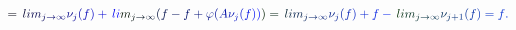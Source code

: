 \documentclass[12pt]{article}
\begin{document}
\makeatletter
\renewcommand*{\@textcolor}[3]{%
  \protect\leavevmode
  \begingroup
    \color#1{#2}#3%
  \endgroup
}
\makeatother
\begin{displaymath}
\mathcolor[RGB]{0,0,15}{=} \mathcolor[RGB]{0,0,30}{\operatorname*} { \mathcolor[RGB]{0,0,45}{l} \mathcolor[RGB]{0,0,60}{i} \mathcolor[RGB]{0,0,75}{m} } _ { \mathcolor[RGB]{0,0,90}{j} \mathcolor[RGB]{0,0,105}{\to} \mathcolor[RGB]{0,0,120}{\infty} } \mathcolor[RGB]{0,0,135}{\nu} _ { \mathcolor[RGB]{0,0,150}{j} } \mathcolor[RGB]{0,0,165}{(} \mathcolor[RGB]{0,0,180}{f} \mathcolor[RGB]{0,0,195}{)} \mathcolor[RGB]{0,0,210}{+} \mathcolor[RGB]{0,0,225}{\operatorname*} { \mathcolor[RGB]{0,0,240}{l} \mathcolor[RGB]{0,0,255}{i} \mathcolor[RGB]{0,15,0}{m} } _ { \mathcolor[RGB]{0,15,15}{j} \mathcolor[RGB]{0,15,30}{\to} \mathcolor[RGB]{0,15,45}{\infty} } \mathcolor[RGB]{0,15,60}{(} \mathcolor[RGB]{0,15,75}{f} \mathcolor[RGB]{0,15,90}{-} \mathcolor[RGB]{0,15,105}{f} \mathcolor[RGB]{0,15,120}{+} \mathcolor[RGB]{0,15,135}{\varphi} \mathcolor[RGB]{0,15,150}{(} \mathcolor[RGB]{0,15,165}{A} \mathcolor[RGB]{0,15,180}{\nu} _ { \mathcolor[RGB]{0,15,195}{j} } \mathcolor[RGB]{0,15,210}{(} \mathcolor[RGB]{0,15,225}{f} \mathcolor[RGB]{0,15,240}{)} \mathcolor[RGB]{0,15,255}{)} \mathcolor[RGB]{0,30,0}{)} \mathcolor[RGB]{0,30,15}{=} \mathcolor[RGB]{0,30,30}{\operatorname*} { \mathcolor[RGB]{0,30,45}{l} \mathcolor[RGB]{0,30,60}{i} \mathcolor[RGB]{0,30,75}{m} } _ { \mathcolor[RGB]{0,30,90}{j} \mathcolor[RGB]{0,30,105}{\to} \mathcolor[RGB]{0,30,120}{\infty} } \mathcolor[RGB]{0,30,135}{\nu} _ { \mathcolor[RGB]{0,30,150}{j} } \mathcolor[RGB]{0,30,165}{(} \mathcolor[RGB]{0,30,180}{f} \mathcolor[RGB]{0,30,195}{)} \mathcolor[RGB]{0,30,210}{+} \mathcolor[RGB]{0,30,225}{f} \mathcolor[RGB]{0,30,240}{-} \mathcolor[RGB]{0,30,255}{\operatorname*} { \mathcolor[RGB]{0,45,0}{l} \mathcolor[RGB]{0,45,15}{i} \mathcolor[RGB]{0,45,30}{m} } _ { \mathcolor[RGB]{0,45,45}{j} \mathcolor[RGB]{0,45,60}{\to} \mathcolor[RGB]{0,45,75}{\infty} } \mathcolor[RGB]{0,45,90}{\nu} _ { \mathcolor[RGB]{0,45,105}{j} \mathcolor[RGB]{0,45,120}{+} \mathcolor[RGB]{0,45,135}{1} } \mathcolor[RGB]{0,45,150}{(} \mathcolor[RGB]{0,45,165}{f} \mathcolor[RGB]{0,45,180}{)} \mathcolor[RGB]{0,45,195}{=} \mathcolor[RGB]{0,45,210}{f} \mathcolor[RGB]{0,45,225}{.}
\end{displaymath}
\end{document}
